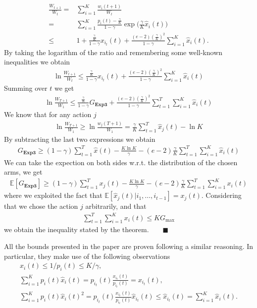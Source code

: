 \documentclass[12pt,a4paper]{article}
\begin{document}
\begin{align*}
		\frac{W_{t+1}}{W_t}={}& \sum_{i=1}^{K}\frac{w_i(t+1)}{W_t}\\
			     ={}& \sum_{i=1}^{K}\frac{p_i(t)-\frac{\gamma}{K}}{1-\gamma}\exp\bigg(\frac{\gamma}{K}\hat{x}_i(t)\bigg)\\
			     \leq{}& 1+ \frac{\frac{\gamma}{K}}{1-\gamma}x_{i_t}(t)+\frac{(e-2)(\frac{\gamma}{K})^2}{1-\gamma}\sum_{i=1}^{K}\hat{x}_i(t).
\end{align*}
By taking the logarithm of the ratio and remembering some well-known inequalities we obtain
\begin{align*}
	\ln \frac{W_{t+1}}{W_{t}}\leq \frac{\frac{\gamma}{K}}{1-\gamma}x_{i_t}(t) + \frac{(e-2)(\frac{\gamma}{K})^2}{1-\gamma}\sum_{i=1}^{K}\hat{x}_i(t)
\end{align*}
Summing over $t$ we get
\begin{align*}
		\ln \frac{W_{T+1}}{W_1} \leq \frac{\frac{\gamma}{K}}{1-\gamma}G_{\textbf{Exp3}} + \frac{(e-2)(\frac{\gamma}{K})^2}{1-\gamma} \sum_{t=1}^{T}\sum_{i=1}^{K}\hat{x}_i(t)
\end{align*}
We know that for any action $j$
\begin{align*}
	\ln \frac{W_{T+1}}{W_1} \geq \ln \frac{w_j(T+1)}{W_1} = \frac{\gamma}{K}\sum_{t=1}^{T}\hat{x}_j(t)-\ln K
\end{align*}
By subtracting the last two expressions we obtain 
\begin{align*}
	G_{\textbf{Exp3}} \geq (1-\gamma)\sum_{t=1}^{T}\hat{x}(t)-\frac{K\ln K}{\gamma}-(e-2)\frac{\gamma}{K}\sum_{t=1}^{T}\sum_{i=1}^{K}\hat{x}_i(t)
\end{align*}
We can take the expection on both sides w.r.t. the distribution of the chosen arms,  we get
\begin{align*}
		\mathbb{E}[G_{\textbf{Exp3}}] \geq (1-\gamma)\sum_{t=1}^{T}x_j(t)-\frac{K\ln K}{\gamma}-(e-2)\frac{\gamma}{K}\sum_{t=1}^{T}\sum_{i=1}^{K}x_i(t)
\end{align*}
where we exploited the fact that $\mathbb{E}[\hat{x}_j(t)|i_1,\dots,i_{t-1}] = x_j(t)$. Considering that we chose the action $j$ arbitrarily, and that
\begin{align*}
	\sum_{t=1}^{T}\sum_{i=1}^{K}x_i(t)\leq K G_{\max}
\end{align*}
we obtain the inequality stated by the theorem. \,\,\,\,\,\,\,\, $\blacksquare$

All the bounds presented in the paper are proven following a similar reasoning. In particular, they make use of the following observations
\begin{gather*} 
	\hat{x}_i(t) \leq 1/p_i(t) \leq K/\gamma,  \\
	\sum_{i=1}^{K}p_i(t)\hat{x}_i(t) = p_{i_t}(t)\frac{x_{i_t}(t)}{p_{i_t}(t)} = x_{i_t}(t),\\
	\sum_{i=1}^{K}p_i(t)\hat{x}_i(t)^2=p_{i_t}(t)\frac{x_{i_t}(t)}{p_{i_t}(t)}\hat{x}_{i_t}(t) \leq \hat{x}_{i_t}(t)= \sum_{i=1}^{K}\hat{x}_i(t).
\end{gather*}
\end{document}
